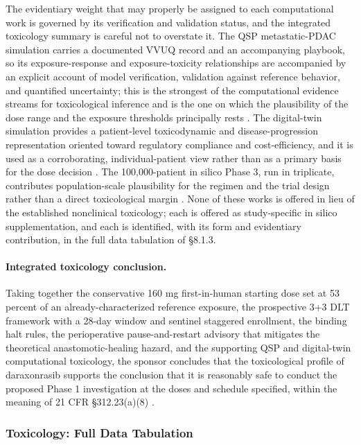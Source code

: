 The evidentiary weight that may properly be assigned to each computational work is
governed by its verification and validation status, and the integrated toxicology
summary is careful not to overstate it. The QSP metastatic-PDAC simulation carries
a documented VVUQ record and an accompanying playbook, so its exposure-response and
exposure-toxicity relationships are accompanied by an explicit account of model
verification, validation against reference behavior, and quantified uncertainty;
this is the strongest of the computational evidence streams for toxicological
inference and is the one on which the plausibility of the dose range and the
exposure thresholds principally rests \cite{qspmetpancre}. The digital-twin
simulation provides a patient-level toxicodynamic and disease-progression
representation oriented toward regulatory compliance and cost-efficiency, and it is
used as a corroborating, individual-patient view rather than as a primary basis for
the dose decision \cite{fdadigtwinpc}. The 100,000-patient in silico Phase 3,
run in triplicate, contributes population-scale plausibility for the regimen and
the trial design rather than a direct toxicological margin
\cite{chatgpt100kp,pdacdigtwinp}. None of these works is offered in lieu of the
established nonclinical toxicology; each is offered as study-specific in silico
supplementation, and each is identified, with its form and evidentiary
contribution, in the full data tabulation of \S 8.1.3.

\paragraph{Integrated toxicology conclusion.}
Taking together the conservative 160 mg first-in-human starting dose set at 53
percent of an already-characterized reference exposure, the prospective 3+3 DLT
framework with a 28-day window and sentinel staggered enrollment, the binding
halt rules, the perioperative pause-and-restart advisory that mitigates the
theoretical anastomotic-healing hazard, and the supporting QSP and digital-twin
computational toxicology, the sponsor concludes that the toxicological profile of
daraxonrasib supports the conclusion that it is reasonably safe to conduct the
proposed Phase 1 investigation at the doses and schedule specified, within the
meaning of 21 CFR \S 312.23(a)(8) \cite{phase1guidance,cfr312paiuni}.

\subsubsection{Toxicology: Full Data Tabulation}

